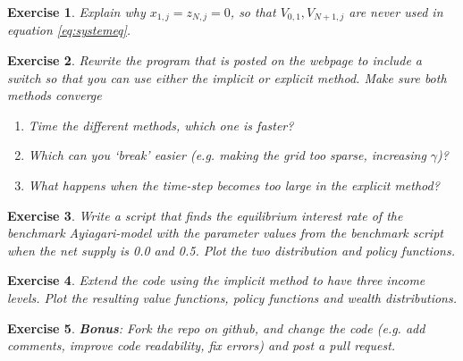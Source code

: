 \documentclass[12pt]{article}
\DeclareMathOperator{\1}{\mathbbm{1}}
\newtheorem{exercise}{Exercise}
\begin{document}
\begin{exercise}
Explain why $x_{1,j}=z_{N,j}=0$, so that $V_{0,1},V_{N+1,j}$ are never used in equation \eqref{eq:systemeq}.  
\end{exercise}

\begin{exercise}
Rewrite the program that is posted on the webpage to include a switch so that you can use either the implicit or explicit method. Make sure both methods converge

\begin{enumerate} 
\item Time the different methods, which one is faster? 
\item Which can you `break' easier (e.g. making the grid too sparse, increasing $\gamma$)? 
\item What happens when the time-step becomes too large in the explicit method?
\end{enumerate}
\end{exercise}

\begin{exercise}
Write a script that finds the equilibrium interest rate of the benchmark Ayiagari-model with the parameter values from the benchmark script when the net supply is 0.0 and 0.5. Plot the two distribution and policy functions.
\end{exercise}

\begin{exercise}
Extend the code using the implicit method to have three income levels. Plot the resulting value functions, policy functions and wealth distributions.
\end{exercise}

\begin{exercise}{\textbf{Bonus}}: Fork the repo on github, and change the code (e.g. add comments, improve code readability, fix errors) and post a pull request.

\end{exercise}


\end{document}
